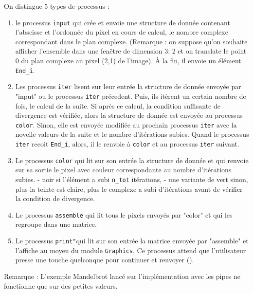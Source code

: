 \documentclass[11pt,a4paper]{article}
\renewcommand{\tt}[1]{\texttt{#1}}
\begin{document}
On distingue 5 types de processus :
\begin{enumerate}

\item le processus \tt{input} qui crée et envoie une structure de donnée
   contenant l'abscisse et l'ordonnée du pixel en cours de calcul, le
   nombre complexe correspondant dans le plan complexe. (Remarque : on
   suppose qu'on souhaite afficher l'ensemble dans une fenêtre de
   dimension 3: 2 et on translate le point 0 du plan complexe au pixel  
   (2,1) de l'image).
   À la fin, il envoie un élément \tt{End\_i}.

\item Les processus \tt{iter} lisent sur leur entrée la structure de donnée
   envoyée par "input" ou le processus \tt{iter} précedent. Puis, ils
   itèrent un certain nombre de fois, le calcul de la suite. Si après ce
   calcul, la condition suffisante de divergence est vérifiée, alors la
   structure de donnée  est
   envoyée au processus \tt{color}. Sinon, elle est envoyée modifiée  au 
   prochain processus \tt{iter} avec la novelle valeurs de la suite et le
   nombre d'itérations \og subies\fg .
   Quand le processus \tt{iter} recoit \tt{End\_i}, alors, il le renvoie
   à \tt{color} et au processus \tt{iter} suivant. 

\item Le processus \tt{color} qui lit sur son entrée la structure de donnée et
   qui renvoie sur sa sortie le pixel avec couleur correspondante au
   nombre d'itérations subies.
   - noir si l'élément a subi \tt{n\_tot} itérations,
   - une variante de vert sinon, plus la teinte est claire, plus le
	 complexe a subi d'itérations avant de vérifier la condition de
	 divergence.

\item Le processus \tt{assemble} qui lit tous le pixels envoyés par "color" et
   qui les regroupe dans une matrice.

\item Le processus \tt{print"}qui lit sur son entrée la matrice envoyée par
	"assemble" et l'affiche au moyen du module \tt{Graphics}.
	Ce processus attend que l'utilisateur presse une touche quelconque
	pour continuer et renvoyer ().


\end{enumerate}

Remarque : 
	L'exemple Mandelbrot lancé sur l'implémentation avec les pipes ne
	fonctionne que sur des petites valeurs. 
\end{document}
